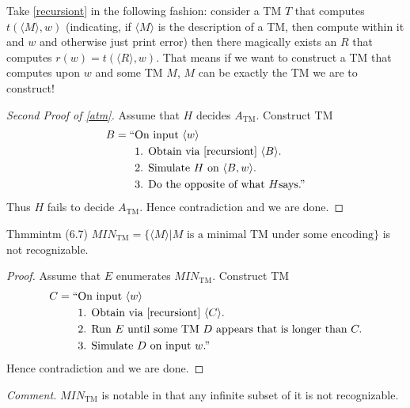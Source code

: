 Take \ref{recursiont} in the following fashion: consider a TM $T$ that computes $t(\langle M\rangle,w)$ (indicating, if $\langle M\rangle$ is the description of a TM, then compute within it and $w$ and otherwise just print error) then there magically exists an $R$ that computes $r(w)=t(\langle R\rangle,w)$. That means if we want to construct a TM that computes upon $w$ and some TM $M$, $M$ can be exactly the TM we are to construct!

\begin{proof}[Second Proof of \ref{atm}]
  Assume that $H$ decides $A_{\mathrm{TM}}$. Construct TM
  \begin{align*}
    B=\text{``} & \text{On input }\langle w\rangle                        \\
                & \text{1. Obtain via \ref{recursiont} }\langle B\rangle. \\
                & \text{2. Simulate }H\text{ on }\langle B,w\rangle.      \\
                & \text{3. Do the opposite of what }H\text{says.''}
  \end{align*}
  Thus $H$ fails to decide $A_{\mathrm{TM}}$. Hence contradiction and we are done.
\end{proof}

\begin{reference}{Thm}{mintm}
  (6.7) $\textit{MIN}_{\mathrm{TM}}=\{\langle M\rangle|M\text{ is a minimal TM under some encoding}\}$ is not recognizable.
\end{reference}

\begin{proof}
  Assume that $E$ enumerates $\textit{MIN}_{\mathrm{TM}}$. Construct TM
  \begin{align*}
    C=\text{``} & \text{On input }\langle w\rangle                                             \\
                & \text{1. Obtain via \ref{recursiont} }\langle C\rangle.                      \\
                & \text{2. Run }E\text{ until some TM }D\text{ appears that is longer than }C. \\
                & \text{3. Simulate }D\text{ on input }w\text{.''}
  \end{align*}
  Hence contradiction and we are done.
\end{proof}

\textit{Comment.} $\textit{MIN}_{\mathrm{TM}}$ is notable in that any infinite subset of it is not recognizable.

